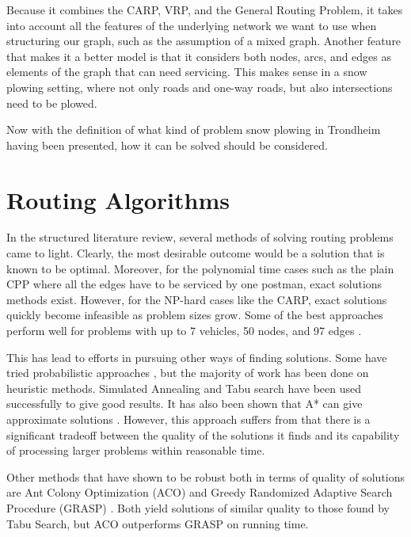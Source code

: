 Because it combines the CARP, VRP, and the General Routing Problem, it takes into account all the features of the underlying network we want to use when structuring our graph, such as the assumption of a mixed graph. Another feature that makes it a better model is that it considers both nodes, arcs, and edges as elements of the graph that can need servicing. This makes sense in a snow plowing setting, where not only roads and one-way roads, but also intersections need to be plowed.

Now with the definition of what kind of problem snow plowing in Trondheim having been presented, how it can be solved should be considered.




\section{Routing Algorithms} %
\label{sec:routing_algorithms}

In the structured literature review, several methods of solving routing problems came to light. Clearly, the most desirable outcome would be a solution that is known to be optimal. Moreover, for the polynomial time cases such as the plain CPP where all the edges have to be serviced by one postman, exact solutions methods exist. However, for the NP-hard cases like the CARP, exact solutions quickly become infeasible as problem sizes grow. Some of the best approaches perform well for problems with up to 7 vehicles, 50 nodes, and 97 edges \citep{belenguer2003cutting}.

This has lead to efforts in pursuing other ways of finding solutions. Some have tried probabilistic approaches \citep{christiansen2009branch}, but the majority of work has been done on heuristic methods. Simulated Annealing \citep{eglese1994simulatedAnnealing} and Tabu search \citep{brandao2008tabu} have been used successfully to give good results. It has also been shown that A* can give approximate solutions \citep{rao2011AStar}. However, this approach suffers from that there is a significant tradeoff between the quality of the solutions it finds and its capability of processing larger problems within reasonable time.

Other methods that have shown to be robust both in terms of quality of solutions are Ant Colony Optimization (ACO) \citep{santos2010ACO} and Greedy Randomized Adaptive Search Procedure (GRASP) \citep{usberti2013grasp}. Both yield solutions of similar quality to those found by Tabu Search, but ACO outperforms GRASP on running time.

